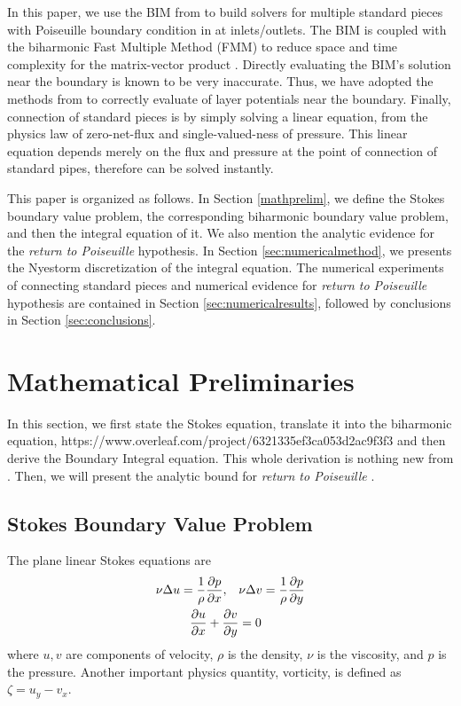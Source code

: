 \documentclass[10pt,twocolumn]{article}
\begin{document}
In this paper, we use the BIM from 
\cite{greengardIntegralEquationMethods1996} to build solvers for multiple standard pieces with Poiseuille boundary condition in at inlets/outlets. 
The BIM is coupled with the biharmonic Fast Multiple Method (FMM) 
to reduce space and time complexity for the matrix-vector product \cite{FlatironinstituteFmm2d2022}.
Directly evaluating the BIM's solution near the boundary is known to be very inaccurate.
Thus, we have adopted the methods from 
\cite{wuSolutionStokesFlow2020,helsingEvaluationLayerPotentials2008} 
to correctly evaluate of layer potentials near the boundary. 
Finally, connection of standard pieces is by simply solving a linear equation, 
from the physics law of zero-net-flux and single-valued-ness of pressure. 
This linear equation depends merely on the flux and pressure at the
point of connection of standard pipes, therefore can be solved instantly. 

This paper is organized as follows. In Section \ref{mathprelim}, we define the Stokes boundary value problem, 
the corresponding biharmonic boundary value problem, and then the integral equation of it. 
We also mention the analytic evidence for the \textit{return to Poiseuille} hypothesis. In Section \ref{sec:numericalmethod}, we presents the Nyestorm discretization
of the integral equation. 
The numerical experiments of connecting standard pieces and numerical evidence for \textit{return to Poiseuille}
hypothesis are contained in Section \ref{sec:numericalresults}, 
followed by conclusions in Section \ref{sec:conclusions}.

\section{Mathematical Preliminaries\label{mathprelim}}

In this section, we first state the Stokes equation, translate it into the biharmonic equation, https://www.overleaf.com/project/6321335ef3ca053d2ac9f3f3
and then derive the Boundary Integral equation. This whole derivation is nothing new from \cite{greengardIntegralEquationMethods1996}. 
Then, we will present the analytic bound for \textit{return to Poiseuille} \cite{gregoryTractionBoundaryValue1980}. 

\subsection{Stokes Boundary Value Problem}

The plane linear Stokes equations are
\begin{align}
  \nu \Delta u = \frac 1 \rho \pdv{p}{x},\quad &\nu \Delta v = \frac 1\rho \pdv{p}{y} 
  \label{stokes} \\
  \pdv{u}{x} + \pdv{v}{y} &= 0
  \label{continuity}
\end{align}
where $u,v$ are components of velocity, 
$\rho$ is the density, 
$\nu$ is the viscosity, 
and $p$ is the pressure. 
Another important physics quantity, vorticity, is defined as $\zeta  = u_y - v_x$. 
\end{document}
